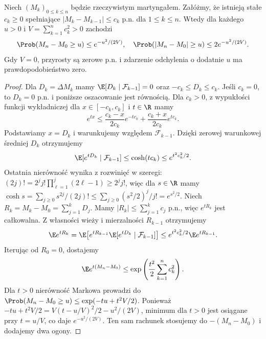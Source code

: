 \begin{twierdzenie}
Niech $(M_k)_{0\leq k\leq n}$ będzie rzeczywistym
martyngałem. Załóżmy, że istnieją stałe
$c_k\geq0$ spełniające
$|M_k-M_{k-1}|\leq c_k$ p.n. dla $1\leq k\leq n$.
Wtedy dla każdego $u>0$ i
$V=\sum_{k=1}^n c_k^2>0$ zachodzi
\[
\Prob(M_n-M_0\geq u)\leq e^{-u^2/(2V)},
\quad
\Prob(|M_n-M_0|\geq u)\leq2e^{-u^2/(2V)}.
\]
Gdy $V=0$, przyrosty są zerowe p.n. i zdarzenie
odchylenia o dodatnie $u$ ma prawdopodobieństwo zero.
\end{twierdzenie}
\begin{proof}
Dla $D_k=\Delta M_k$ mamy
$\E[D_k\mid\mathcal F_{k-1}]=0$ oraz
$-c_k\leq D_k\leq c_k$.
Jeśli $c_k=0$, to $D_k=0$ p.n. i poniższe
oszacowanie jest równością. Dla $c_k>0$,
z wypukłości funkcji wykładniczej dla
$x\in[-c_k,c_k]$ i $t\in\R$ mamy
\[
e^{tx}\leq\frac{c_k-x}{2c_k}e^{-tc_k}
+\frac{c_k+x}{2c_k}e^{tc_k}.
\]
Podstawiamy $x=D_k$ i warunkujemy względem
$\mathcal F_{k-1}$. Dzięki zerowej warunkowej
średniej $D_k$ otrzymujemy
\[
\E[e^{tD_k}\mid\mathcal F_{k-1}]
\leq\cosh(tc_k)\leq e^{t^2c_k^2/2}.
\]
Ostatnia nierówność wynika z rozwinięć w szeregi:
$(2j)!=2^j j!\prod_{\ell=1}^j(2\ell-1)\geq2^j j!$,
więc dla $s\in\R$ mamy
$\cosh s=\sum_{j\geq0}s^{2j}/(2j)!
\leq\sum_{j\geq0}(s^2/2)^j/j!=e^{s^2/2}$.
Niech $R_k=M_k-M_0=\sum_{j=1}^kD_j$.
Mamy $|R_k|\leq\sum_{j=1}^kc_j$ p.n.,
więc $e^{tR_k}$ jest całkowalna. Z własności
wieży i mierzalności $R_{k-1}$ otrzymujemy
\[
\E e^{tR_k}
=\E\bigl[e^{tR_{k-1}}\E[e^{tD_k}\mid\mathcal F_{k-1}]\bigr]
\leq e^{t^2c_k^2/2}\E e^{tR_{k-1}}.
\]
Iterując od $R_0=0$, dostajemy
\[
\E e^{t(M_n-M_0)}\leq
\exp\left(\frac{t^2}{2}\sum_{k=1}^n c_k^2\right).
\]
Dla $t>0$ nierówność Markowa prowadzi do
$\Prob(M_n-M_0\geq u)\leq
\exp(-tu+t^2V/2)$.
Ponieważ $-tu+t^2V/2=V(t-u/V)^2/2-u^2/(2V)$,
minimum dla $t>0$ jest osiągane przy $t=u/V$,
co daje $e^{-u^2/(2V)}$. Ten sam rachunek stosujemy do
$-(M_n-M_0)$ i dodajemy dwa ogony.
\end{proof}

